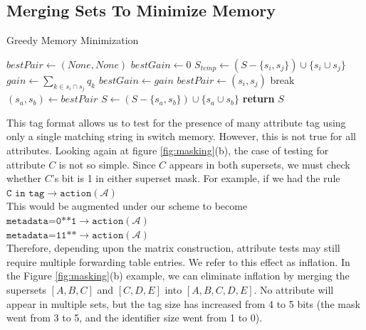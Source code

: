 \subsection{Merging Sets To Minimize Memory}
\begin{algorithm}
  \caption{Greedy Memory Minimization}\label{alg:memory_min}
  \begin{algorithmic}[1]
      	\State $bestPair\gets (None, None)$
      	\State $bestGain\gets 0$
      		\State $S_{temp} \gets (S-\{s_i, s_j\}) \cup \{s_i\cup s_j\}$
      			\State $gain \gets \sum_{k \in s_i\cap s_j}q_k$
      				\State $bestGain \gets gain$
      				\State $bestPair \gets (s_i, s_j)$
      			\EndIf
      		\EndIf
      	\EndFor
      		\State break
      	\EndIf
      	\State $(s_a, s_b) \gets bestPair$
      	\State $S \gets (S-\{s_a, s_b\}) \cup \{s_a\cup s_b\}$
      \EndWhile
      \State \textbf{return} $S$
    \EndProcedure
  \end{algorithmic}
\end{algorithm}

This tag format allows us to test for the presence of many attribute tag using only a single matching string in switch memory.
However, this is not true for all attributes. Looking again at figure \ref{fig:masking}(b), the case of testing for attribute $C$ is not so simple. Since $C$ appears in both supersets, we must check whether $C$'s bit is 1 in either superset mask. For example, if we had the rule\\
\noindent
{%
$\texttt{C in tag} \rightarrow \texttt{action}(\mathcal{A})$\\
}
This would be augmented under our scheme to become\\
\noindent
{%
$\texttt{metadata=0**1} \rightarrow \texttt{action}(\mathcal{A})$\\
$\texttt{metadata=11**} \rightarrow \texttt{action}(\mathcal{A})$\\
}
Therefore, depending upon the matrix construction, attribute tests may still require multiple forwarding table entries. We refer to this effect as inflation. In the Figure \ref{fig:masking}(b) example, we can eliminate inflation by merging the supersets $[A,B,C]$ and $[C,D,E]$ into $[A,B,C,D,E]$. No attribute will appear in multiple sets, but the tag size has increased from 4 to 5 bits (the mask went from 3 to 5, and the identifier size went from 1 to 0).

